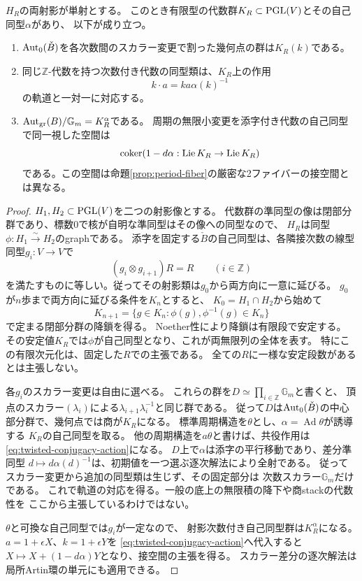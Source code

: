 \begin{proposition}[有限次元群による周期の比較]\label{prop:finite-dimensional-period-group}
$H_R$の両射影が単射とする。
このとき有限型の代数群$K_R\subset\mathrm{PGL}(V)$とその自己同型$\alpha$があり、
以下が成り立つ。
\begin{enumerate}
\item $\operatorname{Aut}_0(\check B)$を各次数間のスカラー変更で割った幾何点の群は$K_R(k)$である。
\item 同じ$\mathbb Z$-代数を持つ次数付き代数の同型類は、$K_R$上の作用
\begin{equation}\label{eq:twisted-conjugacy-action}
   k\cdot a=k a\alpha(k)^{-1}
\end{equation}
の軌道と一対一に対応する。
\item $\operatorname{Aut}_{\mathrm{gr}}(B)/\mathbb G_m=K_R^\alpha$である。
周期の無限小変更を添字付き代数の自己同型で同一視した空間は
\begin{equation}\label{eq:period-tangent-cokernel}
 \operatorname{coker}(1-d\alpha:\operatorname{Lie} K_R\to\operatorname{Lie} K_R)
\end{equation}
である。この空間は命題\ref{prop:period-fiber}の厳密な2ファイバーの接空間とは異なる。
\end{enumerate}
\end{proposition}
\begin{proof}
$H_1,H_2\subset\mathrm{PGL}(V)$を二つの射影像とする。
代数群の準同型の像は閉部分群であり、標数0で核が自明な準同型はその像への同型なので、
$H_R$は同型$\phi:H_1\xrightarrow{\sim}H_2$のgraphである。
添字を固定する$\check B$の自己同型は、各隣接次数の線型同型$g_i:V\to V$で
\[
  (g_i\otimes g_{i+1})R=R\qquad(i\in\mathbb Z)
\]
を満たすものに等しい。従ってその射影類は$g_0$から両方向に一意に延びる。
$g_0$が$n$歩まで両方向に延びる条件を$K_n$とすると、
$K_0=H_1\cap H_2$から始めて
\[
 K_{n+1}=\{g\in K_n:\phi(g),\phi^{-1}(g)\in K_n\}
\]
で定まる閉部分群の降鎖を得る。
Noether性により降鎖は有限段で安定する。
その安定値$K_R$では$\phi$が自己同型となり、これが両無限列の全体を表す。
特にこの有限次元化は、固定した$R$での主張である。
全ての$R$に一様な安定段数があるとは主張しない。

各$g_i$のスカラー変更は自由に選べる。
これらの群を$D\simeq\prod_{i\in\mathbb Z}\mathbb G_m$と書くと、
頂点のスカラー$(\lambda_i)$による$\lambda_{i+1}\lambda_i^{-1}$と同じ群である。
従って$D$は$\operatorname{Aut}_0(\check B)$の中心部分群で、幾何点では商が$K_R$になる。
標準周期構造を$\theta$とし、$\alpha=\operatorname{Ad}\theta$が誘導する
$K_R$の自己同型を取る。
他の周期構造を$a\theta$と書けば、共役作用は\eqref{eq:twisted-conjugacy-action}になる。
$D$上で$\alpha$は添字の平行移動であり、差分準同型
$d\mapsto d\alpha(d)^{-1}$は、初期値を一つ選ぶ逐次解法により全射である。
従ってスカラー変更から追加の同型類は生じず、その固定部分は
次数スカラー$\mathbb G_m$だけである。
これで軌道の対応を得る。一般の底上の無限積の降下や商stackの代数性を
ここから主張しているわけではない。

$\theta$と可換な自己同型では$g_i$が一定なので、
射影次数付き自己同型群は$K_R^\alpha$になる。
$a=1+\epsilon X$、$k=1+\epsilon Y$を
\eqref{eq:twisted-conjugacy-action}へ代入すると
$X\mapsto X+(1-d\alpha)Y$となり、接空間の主張を得る。
スカラー差分の逐次解法は局所Artin環の単元にも適用できる。
\end{proof}

